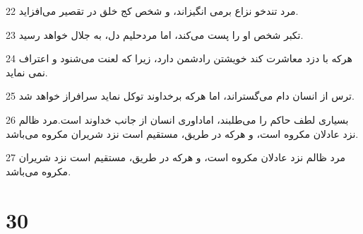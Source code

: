 \par 22 مرد تندخو نزاع برمی انگیزاند، و شخص کج خلق در تقصیر می‌افزاید.
\par 23 تکبر شخص او را پست می‌کند، اما مردحلیم دل، به جلال خواهد رسید.
\par 24 هر‌که با دزد معاشرت کند خویشتن رادشمن دارد، زیرا که لعنت می‌شنود و اعتراف نمی نماید.
\par 25 ترس از انسان دام می‌گستراند، اما هر‌که برخداوند توکل نماید سرافراز خواهد شد.
\par 26 بسیاری لطف حاکم را می‌طلبند، اماداوری انسان از جانب خداوند است.مرد ظالم نزد عادلان مکروه است، و هر‌که در طریق، مستقیم است نزد شریران مکروه می‌باشد.
\par 27 مرد ظالم نزد عادلان مکروه است، و هر‌که در طریق، مستقیم است نزد شریران مکروه می‌باشد.
 
\chapter{30}

